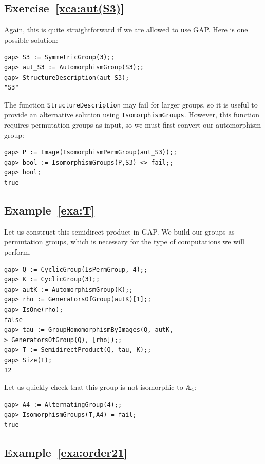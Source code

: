 \subsection*{Exercise~\ref{xca:aut(S3)}}

Again, this is quite straightforward if we are allowed to use GAP.
Here is one possible solution:
\begin{lstlisting}
gap> S3 := SymmetricGroup(3);;
gap> aut_S3 := AutomorphismGroup(S3);;
gap> StructureDescription(aut_S3);
"S3"
\end{lstlisting}
The function \lstinline{StructureDescription} may fail for larger groups,
so it is useful to provide an alternative solution using \lstinline{IsomorphismGroups}.
However, this function requires permutation groups as input,
so we must first convert our automorphism group:
\begin{lstlisting}
gap> P := Image(IsomorphismPermGroup(aut_S3));;
gap> bool := IsomorphismGroups(P,S3) <> fail;;
gap> bool;
true
\end{lstlisting}

\subsection*{Example~\ref{exa:T}}

Let us construct this semidirect product in GAP.
We build our groups as permutation groups, which is necessary
for the type of computations we will perform.
\begin{lstlisting}
gap> Q := CyclicGroup(IsPermGroup, 4);;
gap> K := CyclicGroup(3);;
gap> autK := AutomorphismGroup(K);;
gap> rho := GeneratorsOfGroup(autK)[1];;
gap> IsOne(rho);
false
gap> tau := GroupHomomorphismByImages(Q, autK,
> GeneratorsOfGroup(Q), [rho]);;
gap> T := SemidirectProduct(Q, tau, K);;
gap> Size(T);
12
\end{lstlisting}
Let us quickly check that this group is not isomorphic to $\mathbb{A}_4$:
\begin{lstlisting}
gap> A4 := AlternatingGroup(4);;
gap> IsomorphismGroups(T,A4) = fail;
true
\end{lstlisting}

\subsection*{Example~\ref{exa:order21}}

